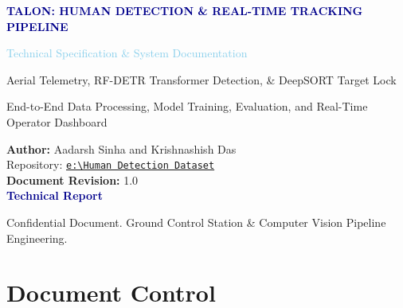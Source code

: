 \documentclass[11pt,a4paper]{article}
\begin{document}
\begin{titlepage}
    \centering
    \vspace*{1.5cm}
    {\Huge\bfseries\textcolor{darkblue}{TALON: HUMAN DETECTION \& REAL-TIME TRACKING PIPELINE}\par}
    \vspace{0.5cm}
    {\LARGE\textcolor{skyblue}{Technical Specification \& System Documentation}\par}
    \vspace{0.3cm}
    {\large\textcolor{codegray}{Aerial Telemetry, RF-DETR Transformer Detection, \& DeepSORT Target Lock}\par}
    \vspace{1.8cm}
    {\large End-to-End Data Processing, Model Training, Evaluation, and Real-Time Operator Dashboard\par}
    \vspace{2.5cm}

    {\normalsize
        \textbf{Author:} Aadarsh Sinha and Krishnashish Das\\
        Repository: \href{file:///e:/Human%20Detection%20Dataset}{\texttt{e:\textbackslash Human Detection Dataset}}\\[1em]
        \textbf{Document Revision:} 1.0\\
        \vspace{0.8cm}
        \LARGE\textcolor{darkblue}{\textbf{Technical Report}}
    }

    \vfill
    {\footnotesize\textcolor{codegray}{Confidential Document. Ground Control Station \& Computer Vision Pipeline Engineering.}}
\end{titlepage}

\newpage
\section*{Document Control}
\end{document}

